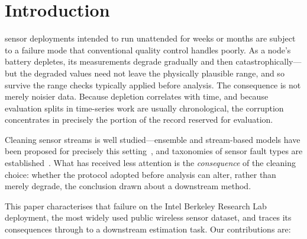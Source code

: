 \documentclass[conference]{IEEEtran}
\begin{document}
\section{Introduction}

 sensor deployments intended to run unattended for
weeks or months are subject to a failure mode that conventional quality control
handles poorly. As a node's battery depletes, its measurements degrade
gradually and then catastrophically---but the degraded values need not leave
the physically plausible range, and so survive the range checks typically
applied before analysis. The consequence is not merely noisier data. Because
depletion correlates with time, and because evaluation splits in time-series
work are usually chronological, the corruption concentrates in precisely the
portion of the record reserved for evaluation.

Cleaning sensor streams is well studied---ensemble and stream-based models have
been proposed for precisely this setting~\cite{iyer2015}, and taxonomies of
sensor fault types are established~\cite{ni2009,sharma2010}. What has received
less attention is the \emph{consequence} of the cleaning choice: whether the
protocol adopted before analysis can alter, rather than merely degrade, the
conclusion drawn about a downstream method.

This paper characterises that failure on the Intel Berkeley Research Lab
deployment, the most widely used public wireless sensor dataset, and traces its
consequences through to a downstream estimation task. Our contributions are:
\end{document}
